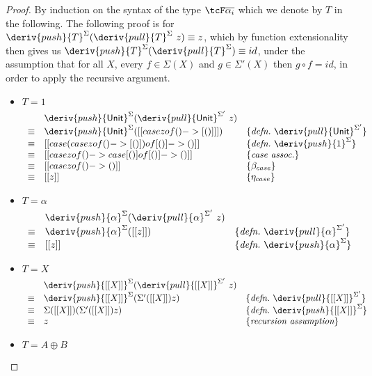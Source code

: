 \begin{proof}
By induction on the syntax of the type $\tcF \overline{\alpha_i}$ which we denote
by $T$ in the following. The following proof is for
$\deriv{push}{T}^\Sigma(\deriv{pull}{T}^\Sigma \ z) \equiv z$, which by
function extensionality then gives us
$\deriv{push}{T}^\Sigma(\deriv{pull}{T}^\Sigma) \equiv id$,
under the assumption that for all $X$, every $f \in \Sigma(X)$ and $g \in
\Sigma'(X)$ then $g \circ f = id$, in order to apply the recursive argument.
%
\begin{itemize}
\item $T = 1$
%
\begin{align*}
\begin{array}{rll}
       & \deriv{push}{\mathsf{Unit}}^\Sigma(\deriv{pull}{\mathsf{Unit}}^{\Sigma'} \ z) & \\
%
\equiv & \deriv{push}{\mathsf{Unit}}^{\Sigma}( [[ case z of () -> [ () ] ]] )
& \{\textit{defn.}\ \deriv{pull}{\mathsf{Unit}}^{\Sigma'} \} \\
%
\equiv & [[ case (case z of () -> [ () ]) of [ () ] -> () ]]
& \{\textit{defn.}\ \deriv{push}{1}^{\Sigma} \} \\
\equiv & [[ case z of () -> case [ () ] of [ () ] -> () ]]
& \{\textit{case assoc.} \} \\
%
\equiv &  [[ case z of () -> () ]]
& \{\beta_{case} \} \\
%
\equiv & [[ z ]]
& \{\eta_{case} \}
\end{array}
\end{align*}
\item $T = \alpha$
%
\begin{align*}
\begin{array}{rll}
       & \deriv{push}{\alpha}^\Sigma(\deriv{pull}{\alpha}^{\Sigma'} \ z) & \\
%
\equiv & \deriv{push}{\alpha}^\Sigma([[ z ]])
& \{\textit{defn.}\ \deriv{pull}{\alpha}^{\Sigma'} \} \\
%
\equiv & [[ z ]] & \{\textit{defn.}\ \deriv{push}{\alpha}^\Sigma \}
\end{array}
\end{align*}
%
\item $T = X$
%
\begin{align*}
\begin{array}{rll}
       & \deriv{push}{[[ X ]]}^{\Sigma}(\deriv{pull}{[[ X ]]}^{\Sigma'} \ z) & \\
%
\equiv &  \deriv{push}{[[ X ]]}^{\Sigma}(\Sigma' ([[X]]) z) & \{\textit{defn.}\ \deriv{pull}{[[ X ]]}^{\Sigma'} \}
\\
\equiv & \Sigma ([[ X ]]) (\Sigma' ([[X]]) z) & \{\textit{defn.}\ \deriv{push}{[[ X ]]}^{\Sigma} \} \\
\equiv & z & \{ \textit{recursion assumption}\}
\end{array}
\end{align*}
%
\item $T = A \oplus B$
%


\end{itemize}
\end{proof}
